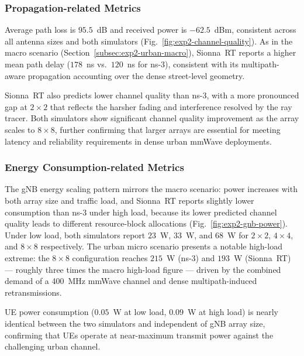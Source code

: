 \subsubsection{Propagation-related Metrics}
\label{subsubsec:exp2-urban-micro-propagation}

Average path loss is $95.5$~dB and received power is $-62.5$~dBm, consistent across all antenna sizes and both simulators (Fig.~\ref{fig:exp2-channel-quality}).
As in the macro scenario (Section~\ref{subsec:exp2-urban-macro}), Sionna~RT reports a higher mean path delay ($178$~ns vs.\ $120$~ns for ns-3), consistent with its multipath-aware propagation accounting over the dense street-level geometry.

Sionna~RT also predicts lower channel quality than ns-3, with a more pronounced gap at $2\times2$ that reflects the harsher fading and interference resolved by the ray tracer.
Both simulators show significant channel quality improvement as the array scales to $8\times8$, further confirming that larger arrays are essential for meeting latency and reliability requirements in dense urban mmWave deployments.

\subsubsection{Energy Consumption-related Metrics}
\label{subsubsec:exp2-urban-micro-energy}

The gNB energy scaling pattern mirrors the macro scenario: power increases with both array size and traffic load, and Sionna~RT reports slightly lower consumption than ns-3 under high load, because its lower predicted channel quality leads to different resource-block allocations (Fig.~\ref{fig:exp2-gnb-power}).
Under low load, both simulators report $23$~W, $33$~W, and $68$~W for $2\times2$, $4\times4$, and $8\times8$ respectively.
The urban micro scenario presents a notable high-load extreme: the $8\times8$ configuration reaches $215$~W (ns-3) and $193$~W (Sionna~RT) — roughly three times the macro high-load figure — driven by the combined demand of a 400~MHz mmWave channel and dense multipath-induced retransmissions.

UE power consumption ($0.05$~W at low load, $0.09$~W at high load) is nearly identical between the two simulators and independent of gNB array size, confirming that UEs operate at near-maximum transmit power against the challenging urban channel.
